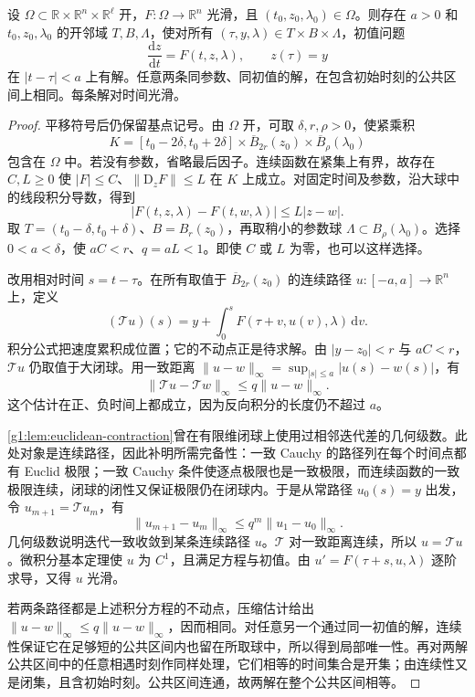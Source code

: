 \begin{theorem}
	\label{g1:thm:ode-local-existence-uniqueness}
	设 \(\Omega\subset\mathbb R\times\mathbb R^n\times\mathbb R^\ell\) 开，\(F:\Omega\to\mathbb R^n\) 光滑，且 \((t_0,z_0,\lambda_0)\in\Omega\)。则存在 \(a>0\) 和 \(t_0,z_0,\lambda_0\) 的开邻域 \(T,B,\Lambda\)，使对所有 \((\tau,y,\lambda)\in T\times B\times\Lambda\)，初值问题
	\begin{equation}
		\label{g1:eq:parameter-ode-initial-value}
		\frac{\mathrm{d}z}{\mathrm{d}t}=F(t,z,\lambda),\qquad z(\tau)=y
	\end{equation}
	在 \(|t-\tau|<a\) 上有解。任意两条同参数、同初值的解，在包含初始时刻的公共区间上相同。每条解对时间光滑。
\end{theorem}
\begin{proof}
	平移符号后仍保留基点记号。由 \(\Omega\) 开，可取 \(\delta,r,\rho>0\)，使紧乘积
	\[
		K=[t_0-2\delta,t_0+2\delta]\times\overline B_{2r}(z_0)\times\overline B_\rho(\lambda_0)
	\]
	包含在 \(\Omega\) 中。若没有参数，省略最后因子。连续函数在紧集上有界，故存在 \(C,L\geq0\) 使 \(|F|\leq C\)、\(\|\mathrm{D}_zF\|\leq L\) 在 \(K\) 上成立。对固定时间及参数，沿大球中的线段积分导数，得到
	\[
		|F(t,z,\lambda)-F(t,w,\lambda)|\leq L|z-w|.
	\]
	取 \(T=(t_0-\delta,t_0+\delta)\)、\(B=B_r(z_0)\)，再取稍小的参数球 \(\Lambda\subset B_\rho(\lambda_0)\)。选择 \(0<a<\delta\)，使 \(aC<r\)、\(q=aL<1\)。即使 \(C\) 或 \(L\) 为零，也可以这样选择。

	改用相对时间 \(s=t-\tau\)。在所有取值于 \(\overline B_{2r}(z_0)\) 的连续路径 \(u:[-a,a]\to\mathbb R^n\) 上，定义
	\[
		(\mathcal T u)(s)=y+\int_0^s F(\tau+v,u(v),\lambda)\,\mathrm{d}v.
	\]
	积分公式把速度累积成位置；它的不动点正是待求解。由 \(|y-z_0|<r\) 与 \(aC<r\)，\(\mathcal Tu\) 仍取值于大闭球。用一致距离 \(\|u-w\|_\infty=\sup_{|s|\leq a}|u(s)-w(s)|\)，有
	\[
		\|\mathcal Tu-\mathcal Tw\|_\infty\leq q\|u-w\|_\infty.
	\]
	这个估计在正、负时间上都成立，因为反向积分的长度仍不超过 \(a\)。

	\cref{g1:lem:euclidean-contraction}曾在有限维闭球上使用过相邻迭代差的几何级数。此处对象是连续路径，因此补明所需完备性：一致 Cauchy 的路径列在每个时间点都有 Euclid 极限；一致 Cauchy 条件使逐点极限也是一致极限，而连续函数的一致极限连续，闭球的闭性又保证极限仍在闭球内。于是从常路径 \(u_0(s)=y\) 出发，令 \(u_{m+1}=\mathcal Tu_m\)，有
	\[
		\|u_{m+1}-u_m\|_\infty\leq q^m\|u_1-u_0\|_\infty.
	\]
	几何级数说明迭代一致收敛到某条连续路径 \(u\)。\(\mathcal T\) 对一致距离连续，所以 \(u=\mathcal Tu\)。微积分基本定理使 \(u\) 为 \(C^1\)，且满足方程与初值。由 \(u'=F(\tau+s,u,\lambda)\) 逐阶求导，又得 \(u\) 光滑。

	若两条路径都是上述积分方程的不动点，压缩估计给出 \(\|u-w\|_\infty\leq q\|u-w\|_\infty\)，因而相同。对任意另一个通过同一初值的解，连续性保证它在足够短的公共区间内也留在所取球中，所以得到局部唯一性。再对两解公共区间中的任意相遇时刻作同样处理，它们相等的时间集合是开集；由连续性又是闭集，且含初始时刻。公共区间连通，故两解在整个公共区间相等。
\end{proof}

